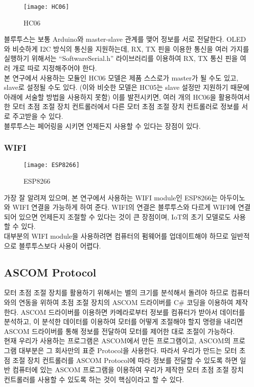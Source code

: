 \begin{wrapfigure}{l}{0.15\textwidth}
	\texttt{[image: HC06]}
	\caption{HC06}
	\label{fig:HC06}
\end{wrapfigure}
블루투스는 보통 Arduino와 master-slave 관계를 맺어 정보를 서로 전달한다. OLED와 비슷하게 I2C 방식의 통신을 지원하는데, RX, TX 핀을 이용한 통신을 여러 가지를 실행하기 위해서는 “SoftwareSerial.h” 라이브러리를 이용하여 RX, TX 통신 핀을 여러 개로 따로 지정해주어야 한다.\\
본 연구에서 사용하는 모듈인 HC06 모델은 제품 스스로가 master가 될 수도 있고, slave로 설정될 수도 있다. (이와 비슷한 모델은 HC05는 slave 설정만 지원하기 때문에 아래에 서술할 방법을 사용하지 못함) 이를 발전시키면, 여러 개의 HC06을 활용하여서 한 모터 초점 조절 장치 컨트롤러에서 다른 모터 초점 조절 장치 컨트롤러로 정보를 서로 주고받을 수 있다.\\
블루투스는 페어링을 시키면 언제든지 사용할 수 있다는 장점이 있다.

\subsubsection{WIFI}

\begin{wrapfigure}{l}{0.06\textwidth}
	\texttt{[image: ESP8266]}
	\caption{ESP8266}
	\label{fig:ESP8266}
\end{wrapfigure}
가장 잘 알려져 있으며, 본 연구에서 사용하는 WIFI module인 ESP8266는 아두이노와 WIFI 연결을 가능하게 하여 준다. WIFI의 연결은 블루투스와 다르게 WIFI에 연결되어 있으면 언제든지 조절할 수 있다는 것이 큰 장점이며, IoT의 초기 모델로도 사용할 수 있다.\\
대부분의 WIFI module을 사용하려면 컴퓨터의 펌웨어를 업데이트해야 하므로 일반적으로 블루투스보다 사용이 어렵다. 

\subsection{ASCOM Protocol}

모터 초점 조절 장치를 활용하기 위해서는 별의 크기를 분석해서 돌려야 하므로 컴퓨터와의 연동을 위하여 초점 조절 장치의 ASCOM 드라이버를 C\# 코딩을 이용하여 제작한다. ASCOM 드라이버를 이용하면 카메라로부터 정보를 컴퓨터가 받아서 데이터를 분석하고, 이 분석한 데이터를 이용하여 모터를 어떻게 조절해야 할지 명령을 내리면 ASCOM 드라이버를 통해 정보를 전달하여 모터를 제어한 대로 조절이 가능하다.\\
현재 우리가 사용하는 프로그램은 ASCOM에서 만든 프로그램이고, ASCOM의 프로그램 대부분은 그 회사만의 표준 Protocol을 사용한다. 따라서 우리가 만드는 모터 초점 조절 장치 컨트롤러를 ASCOM Protocol에 따라 정보를 전달할 수 있도록 하면 일반 컴퓨터에 있는 ASCOM 프로그램을 이용하여 우리가 제작한 모터 초점 조절 장치 컨트롤러를 사용할 수 있도록 하는 것이 핵심이라고 할 수 있다.
